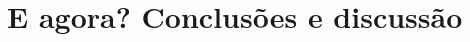\documentclass[report,12pt,oneside,a4paper,english,brazil,sumario=tradicional]{abntex2}
\date{2022}
\newcommand{\relatnum}{XYZ ABC-DEF}
\begin{document}

\imprimirfolhaderosto

\tableofcontents










\chapter{E agora? Conclusões e discussão}




\end{document}

